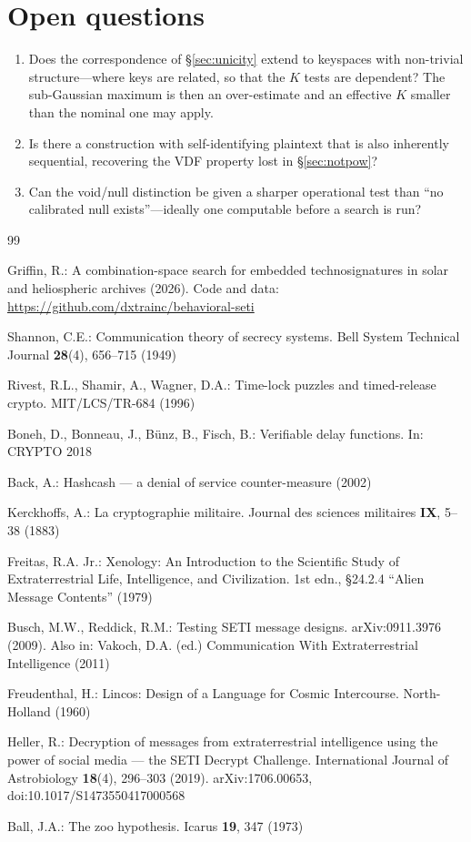 \section{Open questions}

\begin{enumerate}
  \item Does the correspondence of \S\ref{sec:unicity} extend to keyspaces with
    non-trivial structure---where keys are related, so that the $K$ tests are
    dependent? The sub-Gaussian maximum is then an over-estimate and an effective
    $K$ smaller than the nominal one may apply.
  \item Is there a construction with self-identifying plaintext that is also
    inherently sequential, recovering the VDF property lost in
    \S\ref{sec:notpow}?
  \item Can the void/null distinction be given a sharper operational test than
    ``no calibrated null exists''---ideally one computable before a search is run?
\end{enumerate}

\begin{thebibliography}{99}

 Griffin, R.: A combination-space search for embedded
technosignatures in solar and heliospheric archives (2026). Code and data:
\url{https://github.com/dxtrainc/behavioral-seti}

 Shannon, C.E.: Communication theory of secrecy systems. Bell
System Technical Journal \textbf{28}(4), 656--715 (1949)

 Rivest, R.L., Shamir, A., Wagner, D.A.: Time-lock puzzles and
timed-release crypto. MIT/LCS/TR-684 (1996)

 Boneh, D., Bonneau, J., B\"unz, B., Fisch, B.: Verifiable delay
functions. In: CRYPTO 2018

 Back, A.: Hashcash --- a denial of service counter-measure
(2002)

 Kerckhoffs, A.: La cryptographie militaire. Journal des
sciences militaires \textbf{IX}, 5--38 (1883)

 Freitas, R.A. Jr.: Xenology: An Introduction to the
Scientific Study of Extraterrestrial Life, Intelligence, and Civilization. 1st
edn., \S24.2.4 ``Alien Message Contents'' (1979)

 Busch, M.W., Reddick, R.M.: Testing SETI message designs.
arXiv:0911.3976 (2009). Also in: Vakoch, D.A. (ed.) Communication With
Extraterrestrial Intelligence (2011)

 Freudenthal, H.: Lincos: Design of a Language for Cosmic
Intercourse. North-Holland (1960)

 Heller, R.: Decryption of messages from extraterrestrial
intelligence using the power of social media --- the SETI Decrypt Challenge.
International Journal of Astrobiology \textbf{18}(4), 296--303 (2019).
arXiv:1706.00653, doi:10.1017/S1473550417000568

 Ball, J.A.: The zoo hypothesis. Icarus \textbf{19}, 347 (1973)

\end{thebibliography}



